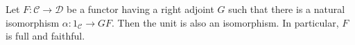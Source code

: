 Let $F\colon \mathcal{C}\to \mathcal{D}$ be a functor having a right adjoint $G$ such
that there is a natural isomorphism $\alpha\colon 1_{\mathcal{C}}\to GF$. Then
the unit is also an isomorphism. In particular, $F$ is full and faithful.
